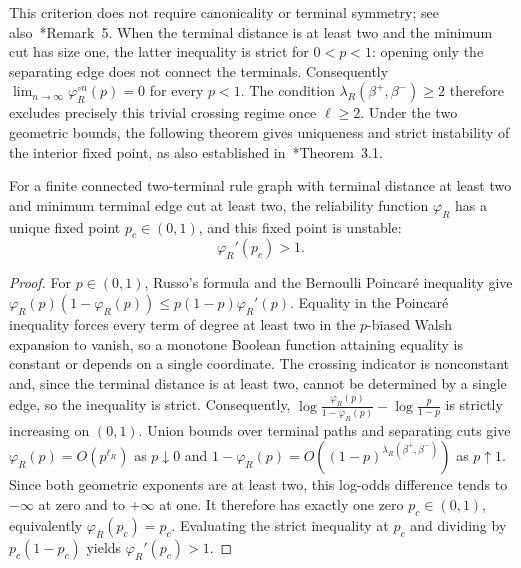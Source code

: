 This criterion does not require canonicality or terminal symmetry; see also~\cite{alves2026percolation}*{Remark~5}.
When the terminal distance is at least two and the minimum cut has size one, the latter inequality is strict for $0<p<1$: opening only the separating edge does not connect the terminals.
Consequently $\displaystyle\lim_{n\to\infty}\varphi_R^{\circ n}(p)=0$ for every $p<1$.
The condition $\lambda_R(\beta^+,\beta^-)\ge2$ therefore excludes precisely this trivial crossing regime once $\ell\ge2$.
Under the two geometric bounds, the following theorem gives uniqueness and strict instability of the interior fixed point, as also established in~\cite{alves2026percolation}*{Theorem~3.1}.

\begin{theorem}
\label{thm:unique-unstable-critical-point}
For a finite connected two-terminal rule graph with terminal distance at least two and minimum terminal edge cut at least two, the reliability function $\varphi_R$ has a unique fixed point $p_c\in(0,1)$, and this fixed point is unstable:
\[
    \varphi_R'(p_c)>1.
\]
\end{theorem}

\begin{proof}
For $p\in(0,1)$, Russo's formula and the Bernoulli Poincar\'e inequality give $\varphi_R(p)(1-\varphi_R(p))\le p(1-p)\varphi_R'(p)$. Equality in the Poincar\'e inequality forces every term of degree at least two in the $p$-biased Walsh expansion to vanish, so a monotone Boolean function attaining equality is constant or depends on a single coordinate. The crossing indicator is nonconstant and, since the terminal distance is at least two, cannot be determined by a single edge, so the inequality is strict. Consequently, $\log\frac{\varphi_R(p)}{1-\varphi_R(p)}-\log\frac{p}{1-p}$ is strictly increasing on $(0,1)$. Union bounds over terminal paths and separating cuts give $\varphi_R(p)=O(p^{\ell_R})$ as $p\downarrow0$ and $1-\varphi_R(p)=O((1-p)^{\lambda_R(\beta^+,\beta^-)})$ as $p\uparrow1$. Since both geometric exponents are at least two, this log-odds difference tends to $-\infty$ at zero and to $+\infty$ at one. It therefore has exactly one zero $p_c\in(0,1)$, equivalently $\varphi_R(p_c)=p_c$. Evaluating the strict inequality at $p_c$ and dividing by $p_c(1-p_c)$ yields $\varphi_R'(p_c)>1$.
\end{proof}


